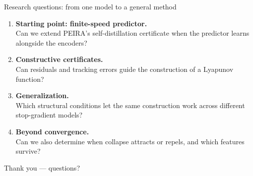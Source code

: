 \documentclass[aspectratio=169]{beamer}
\begin{document}
\begin{frame}{Research questions: from one model to a general method}
  \begin{enumerate}
    \item \textbf{Starting point: finite-speed predictor.}\\
      Can we extend PEIRA's self-distillation certificate when the
      predictor learns alongside the encoders?
    \item \textbf{Constructive certificates.}\\
      Can residuals and tracking errors guide the construction
      of a Lyapunov function?
    \item \textbf{Generalization.}\\
      Which structural conditions let the same construction
      work across different stop-gradient models?
    \item \textbf{Beyond convergence.}\\
      Can we also determine when collapse attracts or repels,
      and which features survive?
  \end{enumerate}
\end{frame}

\begin{frame}[plain]
  \vfill
  \centerline{\Large Thank you --- questions?}
  \vfill\vfill
\end{frame}

\appendix
\end{document}
